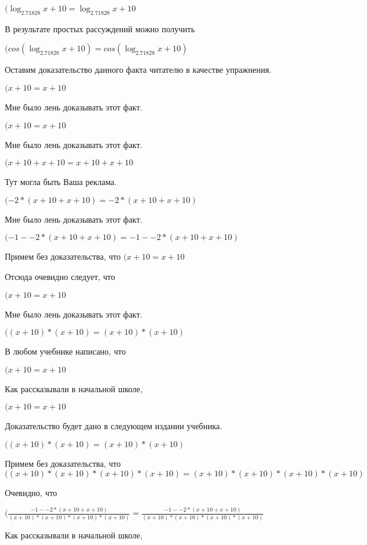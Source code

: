 \documentclass[12pt,a4paper,fleqn]{article}
\theoremstyle{definition}
\begin{document}
$(\log_{ 2.71828 }{ x  +  10 } = \log_{ 2.71828 }{ x  +  10 }$

В результате простых рассуждений можно получить

$(cos(\log_{ 2.71828 }{ x  +  10 }) = cos(\log_{ 2.71828 }{ x  +  10 })$

Оставим доказательство данного факта читателю в качестве упражнения.

$( x  +  10  =  x  +  10 $

Мне было лень доказывать этот факт.

$( x  +  10  =  x  +  10 $

Мне было лень доказывать этот факт.

$( x  +  10  +  x  +  10  =  x  +  10  +  x  +  10 $

Тут могла быть Ваша реклама.

$( -2  * ( x  +  10  +  x  +  10 ) =  -2  * ( x  +  10  +  x  +  10 )$

Мне было лень доказывать этот факт.

$( -1  -  -2  * ( x  +  10  +  x  +  10 ) =  -1  -  -2  * ( x  +  10  +  x  +  10 )$

Примем без доказательства, что
$( x  +  10  =  x  +  10 $

Отсюда очевидно следует, что

$( x  +  10  =  x  +  10 $

Мне было лень доказывать этот факт.

$(( x  +  10 ) * ( x  +  10 ) = ( x  +  10 ) * ( x  +  10 )$

В любом учебнике написано, что

$( x  +  10  =  x  +  10 $

Как рассказывали в начальной школе,

$( x  +  10  =  x  +  10 $

Доказательство будет дано в следующем издании учебника.

$(( x  +  10 ) * ( x  +  10 ) = ( x  +  10 ) * ( x  +  10 )$

Примем без доказательства, что
$(( x  +  10 ) * ( x  +  10 ) * ( x  +  10 ) * ( x  +  10 ) = ( x  +  10 ) * ( x  +  10 ) * ( x  +  10 ) * ( x  +  10 )$

Очевидно, что

$(\frac{ -1  -  -2  * ( x  +  10  +  x  +  10 )}{( x  +  10 ) * ( x  +  10 ) * ( x  +  10 ) * ( x  +  10 )}
 = \frac{ -1  -  -2  * ( x  +  10  +  x  +  10 )}{( x  +  10 ) * ( x  +  10 ) * ( x  +  10 ) * ( x  +  10 )}
$

Как рассказывали в начальной школе,
\end{document}
